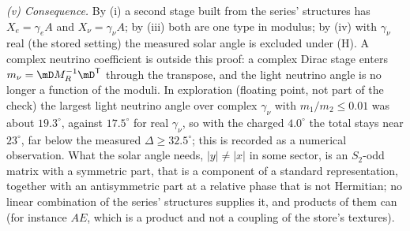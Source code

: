 \emph{(v) Consequence.} By (i) a second stage built from the series' structures has $X_{e} = \gamma_{e}A$ and $X_{\nu} = \gamma_{\nu}A$; by (iii) both are one type in modulus; by (iv) with $\gamma_{\nu}$ real (the stored setting) the measured solar angle is excluded under (H). A complex neutrino coefficient is outside this proof: a complex Dirac stage enters $m_{\nu} = \mD M_{R}^{-1}\mD^{\mathsf T}$ through the transpose, and the light neutrino angle is no longer a function of the moduli. In exploration (floating point, not part of the check) the largest light neutrino angle over complex $\gamma_{\nu}$ with $m_{1}/m_{2} \le 0.01$ was about $19.3^{\circ}$, against $17.5^{\circ}$ for real $\gamma_{\nu}$, so with the charged $4.0^{\circ}$ the total stays near $23^{\circ}$, far below the measured $\Delta \ge 32.5^{\circ}$; this is recorded as a numerical observation. What the solar angle needs, $|y| \ne |x|$ in some sector, is an $S_{2}$-odd matrix with a symmetric part, that is a component of a standard representation, together with an antisymmetric part at a relative phase that is not Hermitian; no linear combination of the series' structures supplies it, and products of them can (for instance $AE$, which is a product and not a coupling of the store's textures).
